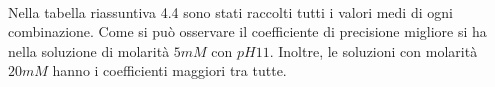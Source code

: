 \\Nella tabella riassuntiva 4.4 sono stati raccolti tutti i valori medi di ogni combinazione. Come si può osservare il coefficiente di precisione migliore si ha nella soluzione di molarità $5mM$ con $pH11$. Inoltre, le soluzioni con molarità $20mM$ hanno i coefficienti maggiori tra tutte.














